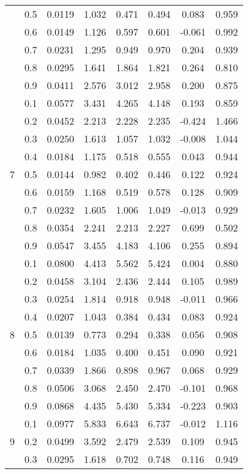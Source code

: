\documentclass[11pt,a4paper]{report}
\begin{document}
\begin{longtable}{ | c | c || c | c | c | c | c | c | }
 & 0.5 & 0.0119 & 1.032 & 0.471 & 0.494 & 0.083 & 0.959 \\
 & 0.6 & 0.0149 & 1.126 & 0.597 & 0.601 & -0.061 & 0.992 \\
 & 0.7 & 0.0231 & 1.295 & 0.949 & 0.970 & 0.204 & 0.939 \\
 & 0.8 & 0.0295 & 1.641 & 1.864 & 1.821 & 0.264 & 0.810 \\
 & 0.9 & 0.0411 & 2.576 & 3.012 & 2.958 & 0.200 & 0.875 \\
 \hline
\multirow{9}{*}{7} & 0.1 & 0.0577 & 3.431 & 4.265 & 4.148 & 0.193 & 0.859 \\
 & 0.2 & 0.0452 & 2.213 & 2.228 & 2.235 & -0.424 & 1.466 \\
 & 0.3 & 0.0250 & 1.613 & 1.057 & 1.032 & -0.008 & 1.044 \\
 & 0.4 & 0.0184 & 1.175 & 0.518 & 0.555 & 0.043 & 0.944 \\
 & 0.5 & 0.0144 & 0.982 & 0.402 & 0.446 & 0.122 & 0.924 \\
 & 0.6 & 0.0159 & 1.168 & 0.519 & 0.578 & 0.128 & 0.909 \\
 & 0.7 & 0.0232 & 1.605 & 1.006 & 1.049 & -0.013 & 0.929 \\
 & 0.8 & 0.0354 & 2.241 & 2.213 & 2.227 & 0.699 & 0.502 \\
 & 0.9 & 0.0547 & 3.455 & 4.183 & 4.106 & 0.255 & 0.894 \\
 \hline
\multirow{9}{*}{8} & 0.1 & 0.0800 & 4.413 & 5.562 & 5.424 & 0.004 & 0.880 \\
 & 0.2 & 0.0458 & 3.104 & 2.436 & 2.444 & 0.105 & 0.989 \\
 & 0.3 & 0.0254 & 1.814 & 0.918 & 0.948 & -0.011 & 0.966 \\
 & 0.4 & 0.0207 & 1.043 & 0.384 & 0.434 & 0.083 & 0.924 \\
 & 0.5 & 0.0139 & 0.773 & 0.294 & 0.338 & 0.056 & 0.908 \\
 & 0.6 & 0.0184 & 1.035 & 0.400 & 0.451 & 0.090 & 0.921 \\
 & 0.7 & 0.0339 & 1.866 & 0.898 & 0.967 & 0.068 & 0.929 \\
 & 0.8 & 0.0506 & 3.068 & 2.450 & 2.470 & -0.101 & 0.968 \\
 & 0.9 & 0.0868 & 4.435 & 5.430 & 5.334 & -0.223 & 0.903 \\
 \hline
\multirow{9}{*}{9} & 0.1 & 0.0977 & 5.833 & 6.643 & 6.737 & -0.012 & 1.116 \\
 & 0.2 & 0.0499 & 3.592 & 2.479 & 2.539 & 0.109 & 0.945 \\
 & 0.3 & 0.0295 & 1.618 & 0.702 & 0.748 & 0.116 & 0.949 \\

\end{longtable}
\end{document}
